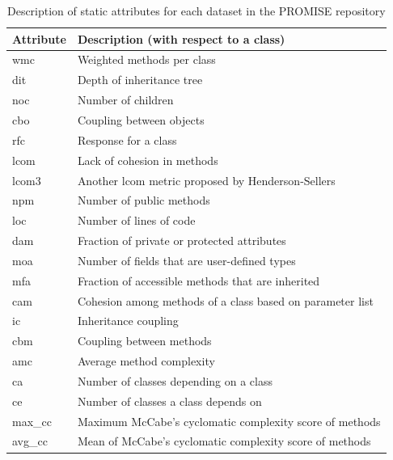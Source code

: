 \documentclass[10pt,compsoc,twocolumn]{IEEEtran}
\begin{document}
\begin{table}[!t]
    \centering
    \caption{Description of static attributes for each dataset in the PROMISE repository}
    \begin{tabularx}{\linewidth}{lL}
    \toprule
        Attribute   & Description (with respect to a class) \\
        \midrule
        wmc & Weighted methods per class \cite{chidamber1994metrics} \\
        dit & Depth of inheritance tree \cite{chidamber1994metrics} \\
        noc & Number of children \cite{chidamber1994metrics} \\
        cbo & Coupling between objects \cite{chidamber1994metrics} \\
        rfc & Response for a class \cite{chidamber1994metrics} \\
        lcom & Lack of cohesion in methods \cite{chidamber1994metrics} \\
        lcom3 & Another lcom metric proposed by Henderson-Sellers \cite{henderson1996coupling} \\
        npm & Number of public methods \cite{bansiya2002hierarchical} \\
        loc & Number of lines of code \cite{bansiya2002hierarchical} \\
        dam & Fraction of private or protected attributes \cite{bansiya2002hierarchical} \\
        moa & Number of fields that are user-defined types \cite{bansiya2002hierarchical} \\
     mfa & Fraction of accessible methods that are inherited \cite{bansiya2002hierarchical} \\
        cam & Cohesion among methods of a class based on parameter list \cite{bansiya2002hierarchical} \\
     ic & Inheritance coupling \cite{tang1999empirical} \\
        cbm & Coupling between methods \cite{tang1999empirical} \\
     amc & Average method complexity \cite{tang1999empirical} \\
        ca & Number of classes depending on a class \cite{tang1999empirical} \\
     ce & Number of classes a class depends on \cite{tang1999empirical} \\
        max\_cc & Maximum McCabe's cyclomatic complexity score of methods \cite{mccabe1976complexity} \\
     avg\_cc & Mean of McCabe's cyclomatic complexity score of methods \cite{mccabe1976complexity} 
    \end{tabularx}
    \label{tab:attributes}
\end{table}
\end{document}
